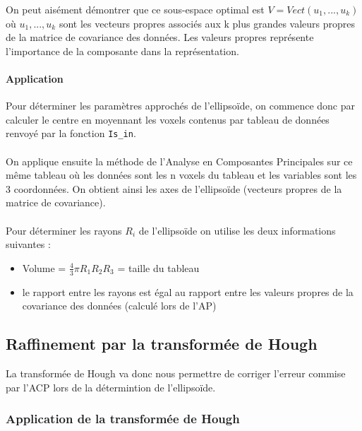 \documentclass{article}
\begin{document}
On peut aisément démontrer que ce sous-espace optimal est $V=Vect(u_1,..., u_k)$ où $u_1,..., u_k$ sont les vecteurs propres associés aux k plus grandes valeurs propres de la matrice de covariance des données. Les valeurs propres représente l'importance de la composante dans la représentation.


\paragraph{Application}

Pour déterminer les paramètres approchés de l'ellipsoïde, on commence donc par calculer le centre en moyennant les voxels contenus par tableau de données renvoyé par la fonction \texttt{Is\_in}. \\\\
On applique ensuite la méthode de l'Analyse en Composantes Principales sur ce même tableau où les données sont les n voxels du tableau et les variables sont les 3 coordonnées. On obtient ainsi les axes de l'ellipsoïde (vecteurs propres de la matrice de covariance).\\\\
Pour déterminer les rayons $R_i$ de l'ellipsoïde on utilise les deux informations suivantes :
\begin{itemize}
	\item Volume = $\frac{4}{3} \pi R_1R_2R_3$ = taille du tableau
	\item le rapport entre les rayons est égal au rapport entre les valeurs propres de la covariance des données (calculé lors de l'AP)
\end{itemize}

\subsection{Raffinement par la transformée de Hough}

La transformée de Hough \cite{bib:Hough, bib:genHough} va donc nous permettre de corriger l'erreur commise par l'ACP lors de la détermintion de l'ellipsoïde.

\subsubsection{Application de la transformée de Hough}
\end{document}
